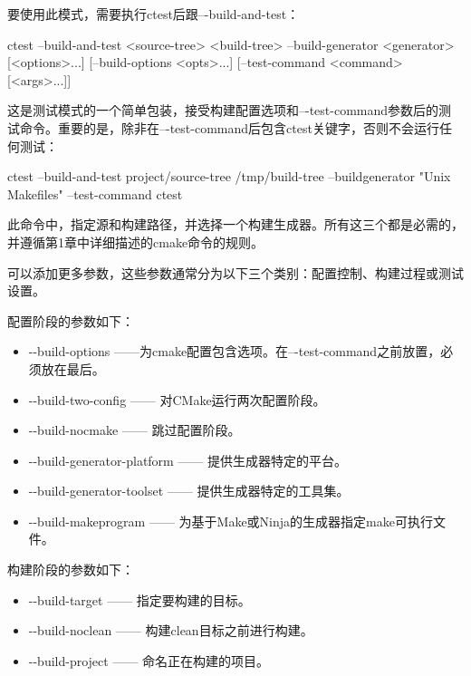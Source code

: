 要使用此模式，需要执行ctest后跟–{}-build-and-test：

\begin{shell}
ctest --build-and-test <source-tree> <build-tree>
      --build-generator <generator> [<options>...]
      [--build-options <opts>...]
      [--test-command <command> [<args>...]]
\end{shell}

这是测试模式的一个简单包装，接受构建配置选项和–{}-test-command参数后的测试命令。重要的是，除非在–{}-test-command后包含ctest关键字，否则不会运行任何测试：

\begin{shell}
ctest --build-and-test project/source-tree /tmp/build-tree --buildgenerator "Unix Makefiles" --test-command ctest
\end{shell}

此命令中，指定源和构建路径，并选择一个构建生成器。所有这三个都是必需的，并遵循第1章中详细描述的cmake命令的规则。

可以添加更多参数，这些参数通常分为以下三个类别：配置控制、构建过程或测试设置。

配置阶段的参数如下：

\begin{itemize}
\item
-{}-build-options ——为cmake配置包含选项。在–{}-test-command之前放置，必须放在最后。

\item
-{}-build-two-config —— 对CMake运行两次配置阶段。

\item
-{}-build-nocmake —— 跳过配置阶段。

\item
-{}-build-generator-platform —— 提供生成器特定的平台。

\item
-{}-build-generator-toolset —— 提供生成器特定的工具集。

\item
-{}-build-makeprogram —— 为基于Make或Ninja的生成器指定make可执行文件。
\end{itemize}

构建阶段的参数如下：

\begin{itemize}
\item
-{}-build-target —— 指定要构建的目标。

\item
-{}-build-noclean —— 构建clean目标之前进行构建。

\item
-{}-build-project —— 命名正在构建的项目。
\end{itemize}


